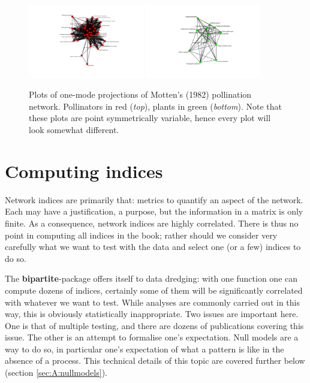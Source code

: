 \documentclass[a4paper, 11pt]{article}\usepackage[]{graphicx}\usepackage[]{color}
\newcommand{\package}[1]{\textbf{#1}}
\begin{document}
\begin{figure}
\centering
	\includegraphics[width=0.45\textwidth]{figures/motten1982_higher_gplot}
	\hfill
	\includegraphics[width=0.45\textwidth]{figures/motten1982_lower_gplot}
	\caption{Plots of one-mode projections of Motten's (1982) pollination network. Pollinators in red (\emph{top}), plants in green (\emph{bottom}). Note that these plots are point symmetrically variable, hence every plot will look somewhat different.}
	\label{fig:Amottengplot}
\end{figure}


\clearpage

\section{Computing indices} %
Network indices are primarily that: metrics to quantify an aspect of the network. Each may have a justification, a purpose, but the information in a matrix is only finite. As a consequence, network indices are highly correlated. There is thus no point in computing all indices in the book; rather should we consider very carefully what we want to test with the data and select one (or a few) indices to do so.

The \package{bipartite}-package offers itself to data dredging: with one function one can compute dozens of indices, certainly some of them will be significantly correlated with whatever we want to test. While analyses are commonly carried out in this way, this is obviously statistically inappropriate. Two issues are important here. One is that of multiple testing, and there are dozens of publications covering this issue. The other is an attempt to formalise one's expectation. Null models are a way to do so, in particular one's expectation of what a pattern is like in the absence of a process. This technical details of this topic are covered further below (section \ref{sec:A:nullmodels}). 
\end{document}
